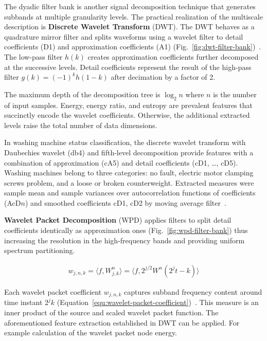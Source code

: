 The dyadic filter bank is another signal decomposition technique that generates subbands at multiple granularity levels. The practical realization of the multiscale description is \textbf{Discrete Wavelet Transform} (DWT). The DWT behaves as a quadrature mirror filter and splits waveforms using a wavelet filter to detail coefficients (D1) and approximation coefficients (A1) (Fig.~\ref{fig:dwt-filter-bank})~\cite{nandi_condition_2019}. The low-pass filter $h(k)$ creates approximation coefficients further decomposed at the successive levels. Detail coefficients represent the result of the high-pass filter $g(k) = (-1)^k h(1 - k)$ after decimation by a factor of 2. 

The maximum depth of the decomposition tree is $\log_2{n}$ where $n$ is the number of input samples. Energy, energy ratio, and entropy are prevalent features that succinctly encode the wavelet coefficients. Otherwise, the additional extracted levels raise the total number of data dimensions.

In washing machine status classification, the discrete wavelet transform with Daubechies wavelet (db4) and fifth-level decomposition provide features with a combination of approximation (cA5) and detail coefficients (cD1, \dots, cD5). Washing machines belong to three categories: no fault, electric motor clamping screws problem, and a loose or broken counterweight. Extracted measures were sample mean and sample variances over autocorrelation functions of coefficients (AcD$n$) and smoothed coefficients cD1, cD2 by moving average filter~\cite{goumas_classification_2002}.

\textbf{Wavelet Packet Decomposition} (WPD) applies filters to split detail coefficients identically as approximation ones (Fig.~\ref{fig:wpd-filter-bank}) thus increasing the resolution in the high-frequency bands and providing uniform spectrum partitioning. 

\begin{ceqn}\begin{align}
 w_{j,n,k} = \langle f, W_{j,k}^n\rangle = \langle f, 2^{j/2} W^n (2^jt-k) \rangle
\label{equ:wavelet-packet-coefficient}
\end{align}\end{ceqn}

Each wavelet packet coefficient $w_{j,n,k}$ captures subband frequency content around time instant $2^j k$ (Equation~\ref{equ:wavelet-packet-coefficient})~\cite{yen_wavelet_2000}. This measure is an inner product of the source and scaled wavelet packet function. The aforementioned feature extraction established in DWT can be applied. For example calculation of the wavelet packet node energy.

